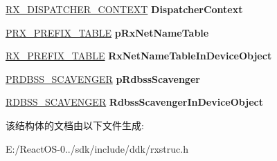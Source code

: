 \begin{DoxyCompactItemize}
\hyperlink{struct___r_x___d_i_s_p_a_t_c_h_e_r___c_o_n_t_e_x_t__}{R\+X\+\_\+\+D\+I\+S\+P\+A\+T\+C\+H\+E\+R\+\_\+\+C\+O\+N\+T\+E\+XT} {\bfseries Dispatcher\+Context}
\item 
\mbox{\label{struct___r_d_b_s_s___d_e_v_i_c_e___o_b_j_e_c_t_aa7483932b4ad4af1c749fbf5c9aa6f3d}} 
\hyperlink{struct___r_x___p_r_e_f_i_x___t_a_b_l_e}{P\+R\+X\+\_\+\+P\+R\+E\+F\+I\+X\+\_\+\+T\+A\+B\+LE} {\bfseries p\+Rx\+Net\+Name\+Table}
\item 
\mbox{\label{struct___r_d_b_s_s___d_e_v_i_c_e___o_b_j_e_c_t_a851b7a23ba690a06560d9850ab3b5975}} 
\hyperlink{struct___r_x___p_r_e_f_i_x___t_a_b_l_e}{R\+X\+\_\+\+P\+R\+E\+F\+I\+X\+\_\+\+T\+A\+B\+LE} {\bfseries Rx\+Net\+Name\+Table\+In\+Device\+Object}
\item 
\mbox{\label{struct___r_d_b_s_s___d_e_v_i_c_e___o_b_j_e_c_t_a4a810553f42635c26fd0e175a79356a5}} 
\hyperlink{struct___r_d_b_s_s___s_c_a_v_e_n_g_e_r}{P\+R\+D\+B\+S\+S\+\_\+\+S\+C\+A\+V\+E\+N\+G\+ER} {\bfseries p\+Rdbss\+Scavenger}
\item 
\mbox{\label{struct___r_d_b_s_s___d_e_v_i_c_e___o_b_j_e_c_t_a49b0e97c337263ccfc77a5de7ecfdb76}} 
\hyperlink{struct___r_d_b_s_s___s_c_a_v_e_n_g_e_r}{R\+D\+B\+S\+S\+\_\+\+S\+C\+A\+V\+E\+N\+G\+ER} {\bfseries Rdbss\+Scavenger\+In\+Device\+Object}
\end{DoxyCompactItemize}


该结构体的文档由以下文件生成\+:\begin{DoxyCompactItemize}
\item 
E\+:/\+React\+O\+S-\/0../sdk/include/ddk/rxstruc.\+h\end{DoxyCompactItemize}
